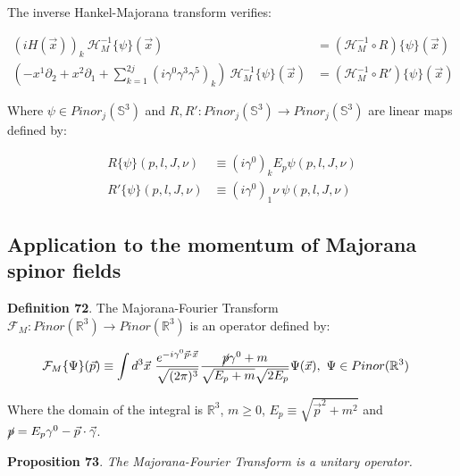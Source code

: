 \documentclass[11pt]{book}
\begin{document}
The inverse Hankel-Majorana transform verifies:

\begin{equation}\begin{aligned}
(iH(\vec{x}))_k\
\mathcal{H}_M^{-1}\{\psi\}(\vec{x})&=
(\mathcal{H}_M^{-1}\circ R)\{\psi\}(\vec{x})\\
(-x^1\partial_2+x^2\partial_1+\sum_{k=1}^{2j}(i\gamma^0\gamma^3\gamma^5)_k)
\ \mathcal{H}_M^{-1}\{\psi\}(\vec{x})&=
(\mathcal{H}_M^{-1}\circ R')\{\psi\}(\vec{x})\end{aligned}\end{equation}

Where \(\psi\in Pinor_j(\mathbb{S}^3)\) and
\(R,R':Pinor_j(\mathbb{S}^3)\to Pinor_j(\mathbb{S}^3)\) are linear maps
defined by:

\begin{equation}\begin{aligned}
R\{\psi\}(p,l,J,\nu)&\equiv (i\gamma^0)_k E_p \psi(p,l,J,\nu)\\
R'\{\psi\}(p,l,J,\nu)&\equiv (i\gamma^0)_1\nu\ \psi(p,l,J,\nu)\end{aligned}\end{equation}

\hypertarget{application-to-the-momentum-of-majorana-spinor-fields}{%
\subsection{Application to the momentum of Majorana spinor
fields}\label{application-to-the-momentum-of-majorana-spinor-fields}}

\textbf{Definition 72}. The Majorana-Fourier Transform
\(\mathcal{F}_M: Pinor(\mathbb{R}^3)\to
Pinor(\mathbb{R}^3)\) is an operator defined by:

\begin{equation}\begin{aligned}
\mathcal{F}_M\{\Psi\}(\vec{p})&\equiv \int d^3\vec{x}\ \frac{e^{-i\gamma^0\vec{p}\cdot
  \vec{x}}}{\sqrt{(2\pi)^3}}
\frac{\cancel p \gamma^0+m}{\sqrt{E_p+m}\sqrt{2E_p}}\Psi(\vec{x}),
\ \Psi\in Pinor(\mathbb{R}^3)\end{aligned}\end{equation}

Where the domain of the integral is \(\mathbb{R}^3\), \(m\geq 0\),
\(E_p\equiv\sqrt{\vec{p}^2+m^2}\) and \(\cancel p=
E_p\gamma^0-\vec{p}\cdot \vec{\gamma}\).

\textbf{Proposition 73}. \emph{The Majorana-Fourier Transform is a
unitary operator.}
\end{document}
